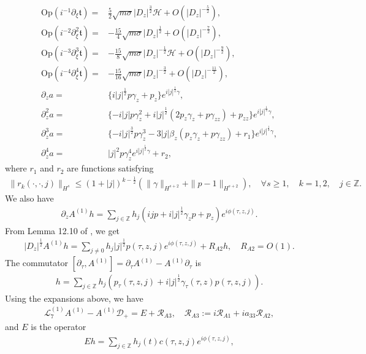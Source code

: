 \documentclass[12pt]{amsart}
\theoremstyle{remark}
\theoremstyle{definition}
\numberwithin{equation}{section}
\newcommand{\p}{\partial}
\newcommand{\Z}{\mathbb{Z}}
\newcommand{\f}{\frac}
\newcommand{\mH}{\mathcal{H}}
\newcommand{\mL}{\mathcal{L}}
\begin{document}
\begin{align*}
\text{Op}(i^{-1}\p_{\xi}\mathfrak{t})
=&\f52\sqrt{m\sigma}|D_z|^{\f32}\mH+O(|D_z|^{-\f52}),\\
\text{Op}(i^{-2}\p_{\xi}^2\mathfrak{t}) 
=&-\f{15}{4}\sqrt{m\sigma}|D_z|^{\f12}+O(|D_z|^{-\f{7}{2}}),\\
\text{Op}(i^{-3}\p_{\xi}^3\mathfrak{t})
=&-\f{15}{8}\sqrt{m\sigma}|D_z|^{-\f12}\mH+O(|D_z|^{-\f{9}{2}}),\\
\text{Op}(i^{-4}\p_{\xi}^4\mathfrak{t})
=&-\f{15}{16}\sqrt{m\sigma}|D_z|^{-\f32}+O(|D_z|^{-\f{11}{2}}),\\
\p_za=&\{i|j|^{\f12}p\gamma_z+p_z\}e^{i|j|^{\f12}\gamma},\\
\p^2_za=&\{-i|j|p\gamma^2_z+i|j|^{\f12}(2p_z\gamma_z+p\gamma_{zz})+p_{zz}\}e^{i|j|^{\f12}\gamma},\\
\p^3_za=&\{-i|j|^{\f32}p\gamma^3_z-3|j|\beta_z(p_z\gamma_z+p\gamma_{zz})+r_1\}e^{i|j|^{\f12}\gamma},\\
\p^4_za=&|j|^2p\gamma^4_ze^{i|j|^{\f12}\gamma}+r_2,
\end{align*}
where $r_1$ and $r_2$ are functions satisfying
\begin{align*}
\|r_k(\cdot,\cdot,j)\|_{H^s}
\leq (1+|j|)^{k-\f12}\left(\|\gamma\|_{H^{s+2}}+\|p-1\|_{H^{s+2}}\right),\quad\forall s\geq1,\quad k=1,2,\quad j\in\Z.
\end{align*}
We also have
\begin{align*}
\p_zA^{(1)}h=\sum_{j\in\Z}h_j(ijp+i|j|^{\f12}\gamma_zp+p_z)e^{i\phi(\tau,z,j)}.
\end{align*}
From Lemma 12.10 of \cite{MR3356988}, we get
\begin{align*}
|D_z|^{\f12}A^{(1)}h=\sum_{j\neq0}h_j|j|^{\f12}p(\tau,z,j)e^{i\phi(\tau,z,j)}+R_{A2}h,\quad R_{A2}=O(1).
\end{align*}
The commutator $[\p_\tau,A^{(1)}]=\p_{\tau}A^{(1)}-A^{(1)}\p_{\tau}$ is
\begin{align*}
[\p_{\tau},A^{(1)}]h=\sum_{j\in\Z}h_j\left(p_{\tau}(\tau,z,j)+i|j|^{\f12}\gamma_\tau(\tau,z)p(\tau,z,j)\right).
\end{align*}
Using the expansions above, we have
\begin{align*}
\mL_7^{(1)}A^{(1)}-A^{(1)}\mathcal{D}_+=E+\mathcal{R}_{A3}, \quad \mathcal{R}_{A3}:=i\mathcal{R}_{A1}+ia_{33}\mathcal{R}_{A2},
\end{align*}
and $E$ is the operator 
\begin{align*}
Eh=\sum_{j\in\Z}h_j(t)c(\tau,z,j)e^{i\phi(\tau,z,j)},
\end{align*}
\end{document}
